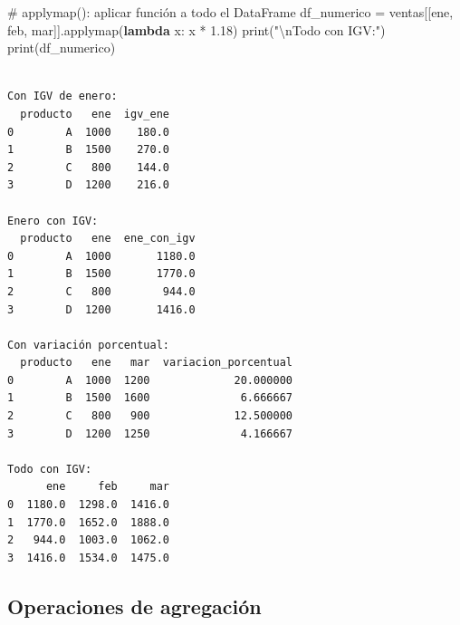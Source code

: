 \documentclass[
  doc,
  floatsintext,
  longtable,
  a4paper,
  nolmodern,
  notxfonts,
  notimes,
  12pt,
  colorlinks=true,linkcolor=blue,citecolor=blue,urlcolor=blue]{apa7}
\newenvironment{Shaded}{\begin{snugshade}}{\end{snugshade}}
\newcommand{\BuiltInTok}[1]{\textcolor[rgb]{0.00,0.23,0.31}{#1}}
\newcommand{\CharTok}[1]{\textcolor[rgb]{0.13,0.47,0.30}{#1}}
\newcommand{\CommentTok}[1]{\textcolor[rgb]{0.37,0.37,0.37}{#1}}
\newcommand{\FloatTok}[1]{\textcolor[rgb]{0.68,0.00,0.00}{#1}}
\newcommand{\KeywordTok}[1]{\textcolor[rgb]{0.00,0.23,0.31}{\textbf{#1}}}
\newcommand{\NormalTok}[1]{\textcolor[rgb]{0.00,0.23,0.31}{#1}}
\newcommand{\OperatorTok}[1]{\textcolor[rgb]{0.37,0.37,0.37}{#1}}
\newcommand{\StringTok}[1]{\textcolor[rgb]{0.13,0.47,0.30}{#1}}
\begin{document}
\begin{Shaded}
\begin{Highlighting}[]
\CommentTok{\# applymap(): aplicar función a todo el DataFrame}
\NormalTok{df\_numerico }\OperatorTok{=}\NormalTok{ ventas[[}\StringTok{\textquotesingle{}ene\textquotesingle{}}\NormalTok{, }\StringTok{\textquotesingle{}feb\textquotesingle{}}\NormalTok{, }\StringTok{\textquotesingle{}mar\textquotesingle{}}\NormalTok{]].applymap(}\KeywordTok{lambda}\NormalTok{ x: x }\OperatorTok{*} \FloatTok{1.18}\NormalTok{)}
\BuiltInTok{print}\NormalTok{(}\StringTok{"}\CharTok{\textbackslash{}n}\StringTok{Todo con IGV:"}\NormalTok{)}
\BuiltInTok{print}\NormalTok{(df\_numerico)}
\end{Highlighting}
\end{Shaded}

\begin{verbatim}

Con IGV de enero:
  producto   ene  igv_ene
0        A  1000    180.0
1        B  1500    270.0
2        C   800    144.0
3        D  1200    216.0

Enero con IGV:
  producto   ene  ene_con_igv
0        A  1000       1180.0
1        B  1500       1770.0
2        C   800        944.0
3        D  1200       1416.0

Con variación porcentual:
  producto   ene   mar  variacion_porcentual
0        A  1000  1200             20.000000
1        B  1500  1600              6.666667
2        C   800   900             12.500000
3        D  1200  1250              4.166667

Todo con IGV:
      ene     feb     mar
0  1180.0  1298.0  1416.0
1  1770.0  1652.0  1888.0
2   944.0  1003.0  1062.0
3  1416.0  1534.0  1475.0
\end{verbatim}

\subsection{Operaciones de
agregación}\label{operaciones-de-agregaciuxf3n}
\end{document}

